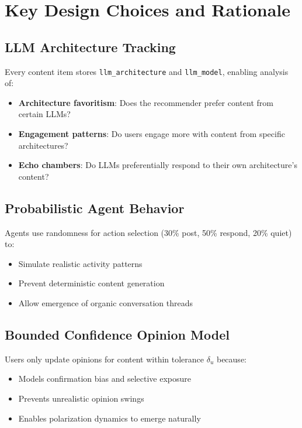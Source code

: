 \documentclass[11pt]{article}
\begin{document}
\section{Key Design Choices and Rationale}

\subsection{LLM Architecture Tracking}

Every content item stores \texttt{llm\_architecture} and \texttt{llm\_model}, enabling analysis of:
\begin{itemize}
    \item \textbf{Architecture favoritism}: Does the recommender prefer content from certain LLMs?
    \item \textbf{Engagement patterns}: Do users engage more with content from specific architectures?
    \item \textbf{Echo chambers}: Do LLMs preferentially respond to their own architecture's content?
\end{itemize}

\subsection{Probabilistic Agent Behavior}

Agents use randomness for action selection (30\% post, 50\% respond, 20\% quiet) to:
\begin{itemize}
    \item Simulate realistic activity patterns
    \item Prevent deterministic content generation
    \item Allow emergence of organic conversation threads
\end{itemize}

\subsection{Bounded Confidence Opinion Model}

Users only update opinions for content within tolerance $\delta_u$ because:
\begin{itemize}
    \item Models confirmation bias and selective exposure
    \item Prevents unrealistic opinion swings
    \item Enables polarization dynamics to emerge naturally
\end{itemize}
\end{document}
